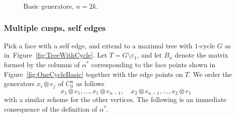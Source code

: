 \documentclass[12pt]{amsart}
\theoremstyle{definition}
\numberwithin{equation}{section}
\begin{document}
\begin{figure}[htpb]
\centering
\begin{minipage}[c]{0.48\textwidth}
\scalebox{0.8}{}
\captionsetup{width=10cm}
\caption{Basic generators, $n=2k+1$.}\label{fig:OneCuspBasicOdd}
\end{minipage}		
\begin{minipage}[c]{0.48\textwidth}
\scalebox{0.8}{}
\captionsetup{width=10cm}
\caption{Basic generators, $n=2k$.}\label{fig:OneCuspBasicEven}
\end{minipage}				
\end{figure}


\subsubsection{Multiple cusps, self edges}
Pick a face with a self edge, and extend to a maximal tree with $1$-cycle $G$ as in~Figure~\ref{fig:TreeWithCycle}. Let $T=G\setminus\varepsilon_1$, and let   
$B_n$ denote the matrix formed by the columns of $\alpha^*$ corresponding to the face points shown in Figure~\ref{fig:OneCycleBasic} together with the edge points on $T$.
We order the generators $x_i\otimes e_j$ of $C_0^n$ as follows
\begin{equation}
x_1\otimes e_1,\dots, x_1\otimes e_{n-1},\quad x_2\otimes e_{n-1},\dots ,x_2\otimes e_1
\end{equation}
with a similar scheme for the other vertices. The following is an immediate consequence of the definition of $\alpha^*$.
\end{document}
